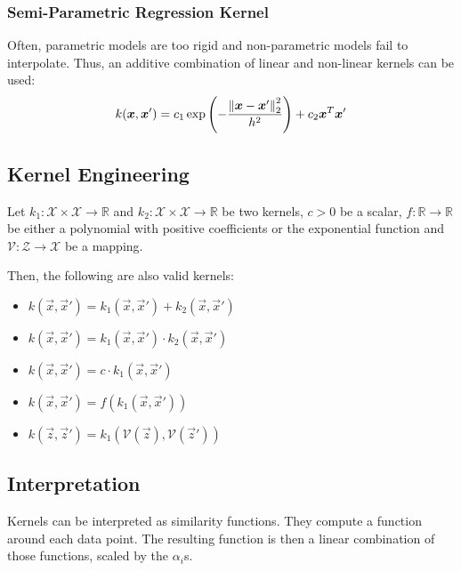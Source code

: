 \subsubsection{Semi-Parametric Regression Kernel}
Often, parametric models are too rigid and non-parametric
models fail to interpolate.
Thus, an additive combination of linear and non-linear
kernels can be used:
\begin{equation*}
    k(\boldsymbol{x}, \boldsymbol{x}') =
    c_1 \exp\left(
            -\frac{\left\lVert\boldsymbol{x} - \boldsymbol{x}'\right\rVert_2^2}{h^2}
        \right) +
    c_2 \boldsymbol{x}^T \boldsymbol{x}'
\end{equation*}


\subsection{Kernel Engineering}
Let $k_1 : \mathcal{X} \times \mathcal{X} \to \mathbb{R}$
and $k_2 : \mathcal{X} \times \mathcal{X} \to \mathbb{R}$
be two kernels,
$c > 0$ be a scalar,
$f : \mathbb{R} \to \mathbb{R}$
be either a polynomial with positive coefficients or the
exponential function and
$\mathcal{V} : \mathcal{Z} \to \mathcal{X}$ be a mapping.

Then, the following are also valid kernels:
\begin{itemize}
    \item $k(\vec{x}, \vec{x}') = k_1(\vec{x}, \vec{x}') + k_2(\vec{x}, \vec{x}')$
    \item $k(\vec{x}, \vec{x}') = k_1(\vec{x}, \vec{x}') \cdot k_2(\vec{x}, \vec{x}')$
    \item $k(\vec{x}, \vec{x}') = c \cdot k_1(\vec{x}, \vec{x}')$
    \item $k(\vec{x}, \vec{x}') = f(k_1(\vec{x}, \vec{x}'))$
    \item $k(\vec{z}, \vec{z}') = k_1(\mathcal{V}(\vec{z}), \mathcal{V}(\vec{z}'))$
\end{itemize}


\subsection{Interpretation}
Kernels can be interpreted as similarity functions.
They compute a function around each data point.
The resulting function is then a linear combination of
those functions, scaled by the $\alpha_i$s.
